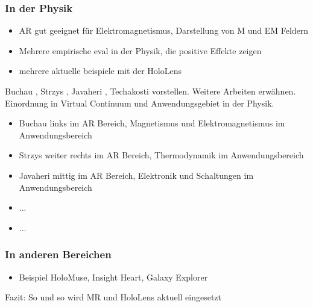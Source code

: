 \subsubsection{In der Physik}
\begin{itemize}
	\item AR gut geeignet für Elektromagnetismus, Darstellung von M und EM Feldern
	\item Mehrere empirische eval in der Physik, die positive Effekte zeigen
	\item mehrere aktuelle beispiele mit der HoloLens
\end{itemize}
Buchau \cite{Buchau09}, Strzys \cite{Strzys18}, Javaheri \cite{Javaheri18}, Techakosti \cite{Techakosit15} vorstellen. Weitere Arbeiten erwähnen.\\
Einordnung in Virtual Continuum und Anwendungsgebiet in der Physik.
\begin{itemize}
	\item Buchau links im AR Bereich, Magnetismus und Elektromagnetismus im Anwendungsbereich
	\item Strzys weiter rechts im AR Bereich, Thermodynamik im Anwendungsbereich
	\item Javaheri mittig im AR Bereich, Elektronik und Schaltungen im Anwendungsbereich
	\item ...
	\item ...
\end{itemize}

\subsubsection{In anderen Bereichen}
\begin{itemize}
	\item Beispiel HoloMuse, Insight Heart, Galaxy Explorer 
\end{itemize}

Fazit: So und so wird MR und HoloLens aktuell eingesetzt

